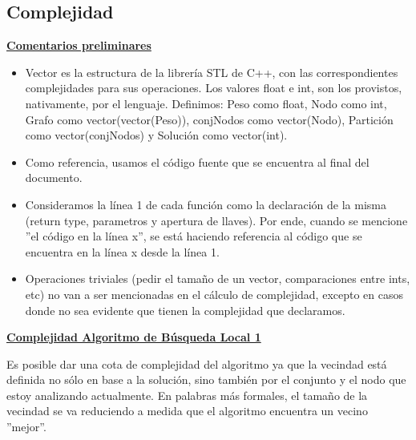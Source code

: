 \documentclass[10pt,a4paper]{article}
\begin{document}
\subsection{Complejidad}
\noindent \textbf{\underline{Comentarios preliminares}}
\begin{itemize}
\item Vector es la estructura de la librería STL de C++, con las correspondientes complejidades para sus operaciones. Los valores float e int, son los provistos, nativamente, por el lenguaje. Definimos: Peso como float, Nodo como int, Grafo como vector(vector(Peso)), conjNodos como vector(Nodo), Partición como vector(conjNodos) y Solución como vector(int).
\item Como referencia, usamos el código fuente que se encuentra al final del documento.
\item Consideramos la línea 1 de cada función como la declaración de la misma (return type, parametros y apertura de llaves). Por ende, cuando se mencione ''el código en la línea x'', se está haciendo referencia al código que se encuentra en la línea x desde la línea 1.
\item Operaciones triviales (pedir el tamaño de un vector, comparaciones entre ints, etc) no van a ser mencionadas en el cálculo de complejidad, excepto en casos donde no sea evidente que tienen la complejidad que declaramos.
\end{itemize}

\noindent \textbf{\underline{Complejidad Algoritmo de Búsqueda Local 1}}

Es posible dar una cota de complejidad del algoritmo ya que la vecindad está definida no sólo en base a la solución, sino también por el conjunto y el nodo que estoy analizando actualmente. En palabras más formales, el tamaño de la vecindad se va reduciendo a medida que el algoritmo encuentra un vecino ''mejor''.
\end{document}
